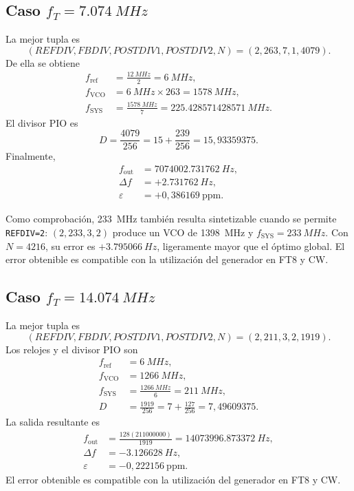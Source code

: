 \documentclass[11pt,a4paper]{article}
\begin{document}
\subsection{Caso \(f_T=\SI{7.074}{MHz}\)}

La mejor tupla es
\begin{equation}
 \boxed{(REFDIV,FBDIV,POSTDIV1,POSTDIV2,N)=(2,263,7,1,4079)}.
\end{equation}
De ella se obtiene
\begin{align}
 f_{\mathrm{ref}} &= \frac{\SI{12}{MHz}}{2}=\SI{6}{MHz},\\
 f_{\mathrm{VCO}} &= \SI{6}{MHz}\times263=\SI{1578}{MHz},\\
 f_{\mathrm{SYS}} &= \frac{\SI{1578}{MHz}}{7}
 =\SI{225.428571428571}{MHz}.
\end{align}
El divisor PIO es
\begin{equation}
 D=\frac{4079}{256}=15+\frac{239}{256}=15{,}93359375.
\end{equation}
Finalmente,
\begin{align}
 f_{\mathrm{out}} &= \SI{7074002.731762}{Hz},\\
 \Delta f &= \boxed{+\SI{2.731762}{Hz}},\\
 \varepsilon &= \boxed{+0{,}386169\ \mathrm{ppm}}.
\end{align}

Como comprobación, \SI{233}{MHz} también resulta sintetizable cuando se permite
\texttt{REFDIV=2}: \((2,233,3,2)\) produce un VCO de \SI{1398}{MHz} y
\(f_{\mathrm{SYS}}=\SI{233}{MHz}\). Con \(N=4216\), su error es
\(+\SI{3.795066}{Hz}\), ligeramente mayor que el óptimo global.
El error obtenible es compatible con la utilización del generador en FT8 y CW.

\subsection{Caso \(f_T=\SI{14.074}{MHz}\)}

La mejor tupla es
\begin{equation}
 \boxed{(REFDIV,FBDIV,POSTDIV1,POSTDIV2,N)=(2,211,3,2,1919)}.
\end{equation}
Los relojes y el divisor PIO son
\begin{align}
 f_{\mathrm{ref}} &= \SI{6}{MHz},\\
 f_{\mathrm{VCO}} &= \SI{1266}{MHz},\\
 f_{\mathrm{SYS}} &= \frac{\SI{1266}{MHz}}{6}=\SI{211}{MHz},\\
 D &= \frac{1919}{256}=7+\frac{127}{256}=7{,}49609375.
\end{align}
La salida resultante es
\begin{align}
 f_{\mathrm{out}} &= \frac{128(211000000)}{1919}
 =\SI{14073996.873372}{Hz},\\
 \Delta f &= \boxed{-\SI{3.126628}{Hz}},\\
 \varepsilon &= \boxed{-0{,}222156\ \mathrm{ppm}}.
\end{align}
El error obtenible es compatible con la utilización del generador en FT8 y CW.
\end{document}
